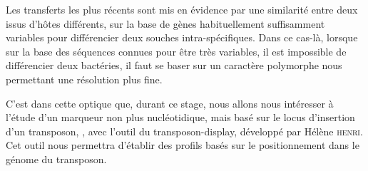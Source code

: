Les transferts les plus récents sont mis en évidence par une similarité entre deux  issus d'hôtes différents, sur la base de gènes habituellement suffisamment variables pour différencier deux souches intra-spécifiques.
Dans ce cas-là, lorsque sur la base des séquences connues pour être très variables, il est impossible de différencier deux bactéries, il faut se baser sur un caractère polymorphe nous permettant une résolution plus fine.

C'est dans cette optique que, durant ce stage, nous allons nous intéresser à l'étude  d'un marqueur non plus nucléotidique, mais basé sur le locus d'insertion d'un transposon, , avec l'outil du transposon-display, développé par Hélène \textsc{henri}\cite{memHH}. 
Cet outil nous permettra d'établir des profils basés sur le positionnement dans le génome du transposon.